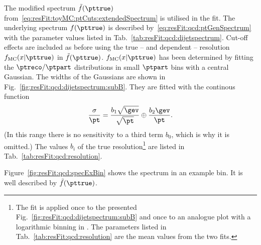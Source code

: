 \documentclass[a4paper]{cmspaper} %
\begin{document}
The modified spectrum $\tilde{f}(\pttrue)$ from~\eqref{eq:resFit:toyMC:ptCuts:extendedSpectrum} is utilised in the fit.
The underlying spectrum $f(\pttrue)$ is described by~\eqref{eq:resFit:qcd:ptGenSpectrum} with the parameter values listed in Tab.~\ref{tab:resFit:qcd:dijetspectrum}.
Cut-off effects are included as before using the true -- and \pt dependent -- resolution $f_{\text{MC}}(x|\pttrue)$ in $\tilde{f}(\pttrue)$.
$f_{\text{MC}}(x|\pttrue)$ has been determined by fitting the $\ptreco/\ptpart$ distributions in small $\ptpart$ bins with a central Gaussian.
The widths of the Gaussians are shown in Fig.~\ref{fig:resFit:qcd:dijetspectrum:subB}.
They are fitted with the continous function
\begin{equation}
  \label{eq:resFit:qcd:sigma}
  \frac{\sigma}{\pt} = \frac{b_{1}\sqrt{\gev}}{\sqrt{\pt}} \oplus \frac{b_{2}\gev}{\pt}.
\end{equation}
(In this \pt range there is no sensitivity to a third term $b_{0}$, which is why it is omitted.)
The values $b_{i}$ of the true resolution\footnote{The fit is applied once to the presented Fig.~\ref{fig:resFit:qcd:dijetspectrum:subB} and once to an analogue plot with a logarithmic binning in \ptpart.
The parameters listed in Tab.~\ref{tab:resFit:qcd:resolution} are the mean values from the two fits.}
are listed in Tab.~\ref{tab:resFit:qcd:resolution}.

Figure~\ref{fig:resFit:qcd:specExBin} shows the \ptpart spectrum in an example bin.
It is well described by $\tilde{f}(\pttrue)$.
\end{document}
